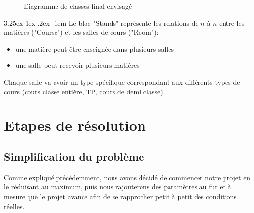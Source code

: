 \documentclass[12pt,a4paper,french]{article}
\makeatletter
\renewcommand\paragraph{\@startsection{paragraph}{5}{\z@}%
  {3.25ex \@plus1ex \@minus.2ex}%
  {-1em}%
  {\normalfont\normalsize\bfseries}}
\makeatother
\begin{document}
\begin{figure}[! ht ]
    \centering
    \begin{minipage}[t]{14 cm}
        \centering
        \caption {Diagramme de classes final envisagé}
    \end{minipage}
\end{figure}

\paragraph{}
Le bloc "Stands" représente les relations de $n$ à $n$ entre les matières ("Course") et les salles de cours ("Room"):
\begin{itemize}
\item une matière peut être enseignée dans plusieurs salles
\item une salle peut recevoir plusieurs matières
\end{itemize}

Chaque salle va avoir un type spécifique correspondant aux différents types de cours (cours classe entière, TP, cours de demi classe).

\newpage
\section{Etapes de résolution}
\subsection{Simplification du problème}
Comme expliqué précédemment, nous avons décidé de commencer notre projet en le réduisant au maximum, puis nous rajouterons des paramètres au fur et à mesure que le projet avance afin de se rapprocher petit à petit des conditions réelles.\\
\end{document}
